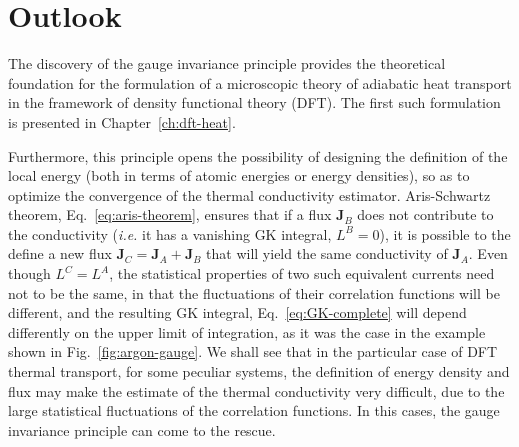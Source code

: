 \section{Outlook}  \label{sec:gauge-outlook}
\begin{LEtext}
The discovery of the gauge invariance principle provides the theoretical foundation for the formulation of a microscopic theory of adiabatic heat transport in the framework of density functional theory (DFT). The first such formulation is presented in Chapter~\ref{ch:dft-heat}. 

Furthermore, this principle opens the possibility of designing the definition of the local energy (both in terms of atomic energies or energy densities), so as to optimize the convergence of the thermal conductivity estimator.
Aris-Schwartz theorem, Eq.~\eqref{eq:aris-theorem}, ensures that if a flux $\mathbf{J}_B$ does not contribute to the conductivity (\emph{i.e.} it has a vanishing GK integral, $L^B=0$), it is possible to the define a new flux $\mathbf{J}_C=\mathbf{J}_A+\mathbf{J}_B$ that will yield the same conductivity of $\mathbf{J}_A$. Even though $L^C=L^A$, the statistical properties of two such equivalent currents need not to be the same, in that the fluctuations of their correlation functions will be different, and the resulting GK integral, Eq.~\eqref{eq:GK-complete} will depend differently on the upper limit of integration, as it was the case in the example shown in Fig.~\ref{fig:argon-gauge}.
We shall see that in the particular case of DFT thermal transport, for some peculiar systems, the definition of energy density and flux may make the estimate of the thermal conductivity very difficult, due to the large statistical fluctuations of the correlation functions. In this cases, the gauge invariance principle can come to the rescue.
\end{LEtext}
